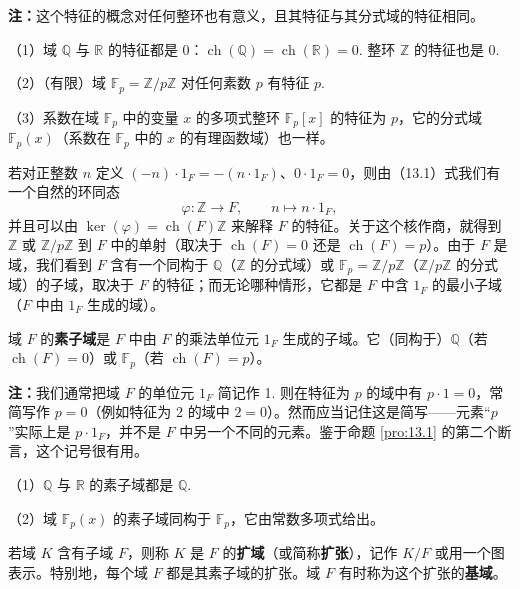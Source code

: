 \noindent\textbf{注：}这个特征的概念对任何整环也有意义，且其特征与其分式域的特征相同。

\begin{example}
（1）域 \(\mathbb{Q}\) 与 \(\mathbb{R}\) 的特征都是 0：\(\operatorname{ch}(\mathbb{Q}) = \operatorname{ch}(\mathbb{R}) = 0\). 整环 \(\mathbb{Z}\) 的特征也是 0.

（2）（有限）域 \(\mathbb{F}_p = \mathbb{Z}/p\mathbb{Z}\) 对任何素数 \(p\) 有特征 \(p\).

（3）系数在域 \(\mathbb{F}_p\) 中的变量 \(x\) 的多项式整环 \(\mathbb{F}_p[x]\) 的特征为 \(p\)，它的分式域 \(\mathbb{F}_p(x)\)（系数在 \(\mathbb{F}_p\) 中的 \(x\) 的有理函数域）也一样。
\end{example}

若对正整数 \(n\) 定义 \((-n) \cdot 1_F = -(n \cdot 1_F)\)、\(0 \cdot 1_F = 0\)，则由（13.1）式我们有一个自然的环同态
\[
\varphi : \mathbb{Z} \to F, \qquad n \mapsto n \cdot 1_F,
\]
并且可以由 \(\ker(\varphi) = \operatorname{ch}(F)\mathbb{Z}\) 来解释 \(F\) 的特征。关于这个核作商，就得到 \(\mathbb{Z}\) 或 \(\mathbb{Z}/p\mathbb{Z}\) 到 \(F\) 中的单射（取决于 \(\operatorname{ch}(F) = 0\) 还是 \(\operatorname{ch}(F) = p\)）。由于 \(F\) 是域，我们看到 \(F\) 含有一个同构于 \(\mathbb{Q}\)（\(\mathbb{Z}\) 的分式域）或 \(\mathbb{F}_p = \mathbb{Z}/p\mathbb{Z}\)（\(\mathbb{Z}/p\mathbb{Z}\) 的分式域）的子域，取决于 \(F\) 的特征；而无论哪种情形，它都是 \(F\) 中含 \(1_F\) 的最小子域（\(F\) 中由 \(1_F\) 生成的域）。

\begin{definition}
域 \(F\) 的\textbf{素子域}是 \(F\) 中由 \(F\) 的乘法单位元 \(1_F\) 生成的子域。它（同构于）\(\mathbb{Q}\)（若 \(\operatorname{ch}(F) = 0\)）或 \(\mathbb{F}_p\)（若 \(\operatorname{ch}(F) = p\)）。
\end{definition}

\noindent\textbf{注：}我们通常把域 \(F\) 的单位元 \(1_F\) 简记作 1. 则在特征为 \(p\) 的域中有 \(p \cdot 1 = 0\)，常简写作 \(p = 0\)（例如特征为 2 的域中 \(2 = 0\)）。然而应当记住这是简写——元素“\(p\)”实际上是 \(p \cdot 1_F\)，并不是 \(F\) 中另一个不同的元素。鉴于命题 \ref{pro:13.1} 的第二个断言，这个记号很有用。

\begin{example}
（1）\(\mathbb{Q}\) 与 \(\mathbb{R}\) 的素子域都是 \(\mathbb{Q}\).

（2）域 \(\mathbb{F}_p(x)\) 的素子域同构于 \(\mathbb{F}_p\)，它由常数多项式给出。
\end{example}

\begin{definition}
若域 \(K\) 含有子域 \(F\)，则称 \(K\) 是 \(F\) 的\textbf{扩域}（或简称\textbf{扩张}），记作 \(K/F\) 或用一个图表示。特别地，每个域 \(F\) 都是其素子域的扩张。域 \(F\) 有时称为这个扩张的\textbf{基域}。
\end{definition}

